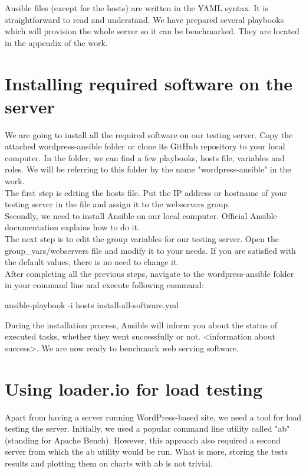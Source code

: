 Ansible files (except for the hosts) are written in the YAML syntax. It is straightforward to read and understand. We have prepared several playbooks which will provision the whole server so it can be benchmarked. They are located in the appendix of the work.

\section{Installing required software on the server}

We are going to install all the required software on our testing server. Copy the attached wordpress-ansible folder or clone its GitHub repository to your local computer. In the folder, we can find a few playbooks, hosts file, variables and roles. We will be referring to this folder by the name "wordpress-ansible" in the work. \\

The first step is editing the hosts file. Put the IP address or hostname of your testing server in the file and assign it to the webservers group. \\

Secondly, we need to install Ansible on our local computer. Official Ansible documentation \cite{Ansible:install} explains how to do it. \\

The next step is to edit the group variables for our testing server. Open the group\_vars/webservers file and modify it to your needs. If you are satisfied with the default values, there is no need to change it. \\

After completing all the previous steps, navigate to the wordpress-ansible folder in your command line and execute following command:

ansible-playbook -i hosts install-all-software.yml

During the installation process, Ansible will inform you about the status of executed tasks, whether they went successfully or not. <information about success>. We are now ready to benchmark web serving software.

\section{Using loader.io for load testing}

Apart from having a server running WordPress-based site, we need a tool for load testing the server. Initially, we used a popular command line utility called "ab" (standing for Apache Bench). However, this approach also required a second server from which the ab utility would be run. What is more, storing the tests results and plotting them on charts with ab is not trivial. \\

